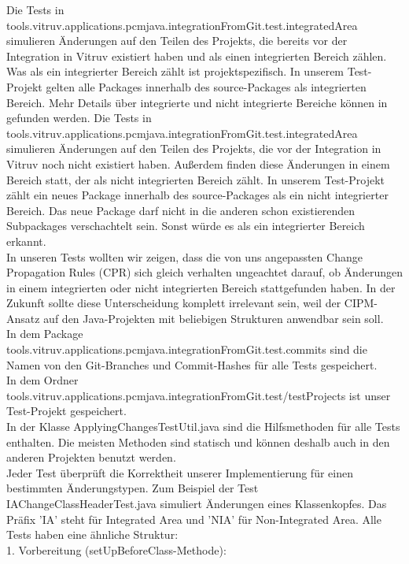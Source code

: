 Die Tests in tools.vitruv.applications.pcmjava.integrationFromGit.test.integratedArea simulieren Änderungen auf den Teilen des Projekts, die bereits vor der Integration in Vitruv existiert haben und als einen integrierten Bereich zählen. Was als ein integrierter Bereich zählt ist projektspezifisch. In unserem Test-Projekt gelten alle Packages innerhalb des source-Packages als integrierten Bereich. Mehr Details über integrierte und nicht integrierte Bereiche können in \cite{langhammer2017} gefunden werden. Die Tests in\\ tools.vitruv.applications.pcmjava.integrationFromGit.test.integratedArea simulieren Änderungen auf den Teilen des Projekts, die vor der Integration in Vitruv noch nicht existiert haben. Außerdem finden diese Änderungen in einem Bereich statt, der als nicht integrierten Bereich zählt. In unserem Test-Projekt zählt ein neues Package innerhalb des source-Packages als ein nicht integrierter Bereich. Das neue Package darf nicht in die anderen schon existierenden Subpackages verschachtelt sein. Sonst würde es als ein integrierter Bereich erkannt.
\\
In unseren Tests wollten wir zeigen, dass die von uns angepassten Change Propagation Rules (CPR) sich gleich verhalten ungeachtet darauf, ob Änderungen in einem integrierten oder nicht integrierten Bereich stattgefunden haben. In der Zukunft sollte diese Unterscheidung komplett irrelevant sein, weil der CIPM-Ansatz \cite{mazkatli2018} auf den Java-Projekten mit beliebigen Strukturen anwendbar sein soll.
\\
In dem Package tools.vitruv.applications.pcmjava.integrationFromGit.test.commits sind die Namen von den Git-Branches und Commit-Hashes für alle Tests gespeichert.
\\
In dem Ordner tools.vitruv.applications.pcmjava.integrationFromGit.test/testProjects ist unser Test-Projekt gespeichert.
\\
In der Klasse ApplyingChangesTestUtil.java sind die Hilfsmethoden für alle Tests enthalten. Die meisten Methoden sind statisch und können deshalb auch in den anderen Projekten benutzt werden.
\\
Jeder Test überprüft die Korrektheit unserer Implementierung für einen bestimmten Änderungstypen. Zum Beispiel der Test IAChangeClassHeaderTest.java simuliert Änderungen eines Klassenkopfes. Das Präfix 'IA' steht für Integrated Area und 'NIA' für Non-Integrated Area. Alle Tests haben eine ähnliche Struktur:
\\
1. Vorbereitung (setUpBeforeClass-Methode):
